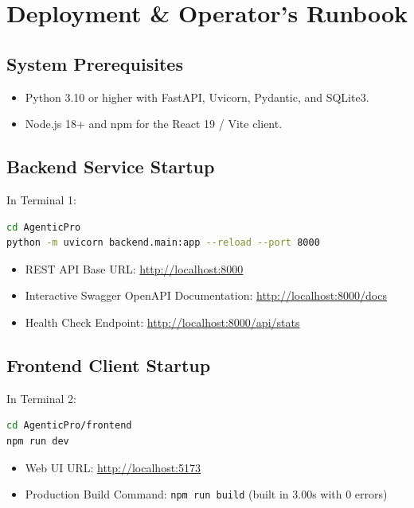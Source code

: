 \documentclass[12pt, a4paper]{report}
\begin{document}
\chapter{Deployment \& Operator's Runbook}

\section{System Prerequisites}
\begin{itemize}[itemsep=2pt,leftmargin=1.5em]
    \item Python 3.10 or higher with FastAPI, Uvicorn, Pydantic, and SQLite3.
    \item Node.js 18+ and npm for the React 19 / Vite client.
\end{itemize}

\section{Backend Service Startup}
In Terminal 1:
\begin{lstlisting}[language=bash]
cd AgenticPro
python -m uvicorn backend.main:app --reload --port 8000
\end{lstlisting}
\begin{itemize}[itemsep=1pt,leftmargin=1.5em]
    \item REST API Base URL: \url{http://localhost:8000}
    \item Interactive Swagger OpenAPI Documentation: \url{http://localhost:8000/docs}
    \item Health Check Endpoint: \url{http://localhost:8000/api/stats}
\end{itemize}

\section{Frontend Client Startup}
In Terminal 2:
\begin{lstlisting}[language=bash]
cd AgenticPro/frontend
npm run dev
\end{lstlisting}
\begin{itemize}[itemsep=1pt,leftmargin=1.5em]
    \item Web UI URL: \url{http://localhost:5173}
    \item Production Build Command: \texttt{npm run build} (built in 3.00s with 0 errors)
\end{itemize}
\end{document}
